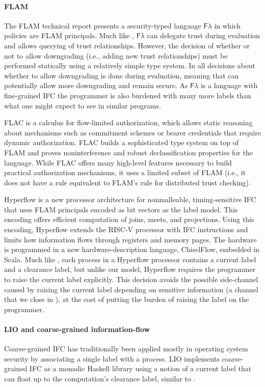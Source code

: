 \paragraph{FLAM}
The FLAM technical report \cite{flamtr} presents a security-typed language $\mathsf{F}\lambda$ in which policies are FLAM principals. Much like \lang{}, $\mathsf{F}\lambda$ can delegate trust during evaluation and allows querying of trust relationships. However, the decision of whether or not to allow downgrading (i.e., adding new trust relationships) must be performed statically using a relatively simple type system. In \lang{} all decisions about whether to allow downgrading is done during evaluation, meaning that \lang{} can potentially allow more downgrading and remain secure. As $\mathsf{F}\lambda$ is a language with fine-grained IFC the programmer is also burdened with many more labels than what one might expect to see in similar \lang{} programs.

FLAC \cite{7536372} is a calculus for flow-limited authorization, which allows static reasoning about mechanisms such as commitment schemes or bearer credentials that require dynamic authorization. FLAC builds a sophisticated type system on top of FLAM and proves noninterference and robust declassification properties for the language. While FLAC offers many high-level features necessary to build practical authorization mechanisms, it uses a limited subset of FLAM (i.e., it does not have a rule equivalent to FLAM's  rule for distributed trust checking).

Hyperflow \cite{hyperflow} is a new processor architecture for nonmalleable, timing-sensitive IFC that uses FLAM principals encoded as bit vectors as the label model. This encoding offers efficient computation of joins, meets, and projections. Using this encoding, Hyperflow extends the RISC-V processor with IFC instructions and limits how information flows through registers and memory pages. The hardware is programmed in a new hardware-description language, ChiselFlow, embedded in Scala. Much like \lang{}, each process in a Hyperflow processor contains a current label and a clearance label, but unlike our model, Hyperflow requires the programmer to raise the current label explicitly. This decision avoids the possible side-channel caused by raising the current label depending on sensitive information (a channel that we close in \lang), at the cost of putting the burden of raising the label on the programmer.

\paragraph{LIO and coarse-grained information-flow}
Coarse-grained IFC has traditionally been applied mostly in operating system security \cite{Zeldovich:2006:MIF:1267308.1267327, Krohn:2007:IFC:1294261.1294293} by associating a single label with a process. LIO \cite{SRMMlio} implements coarse-grained IFC as a monadic Haskell library using a notion of a current label that can float up to the computation's clearance label, similar to \lang.

